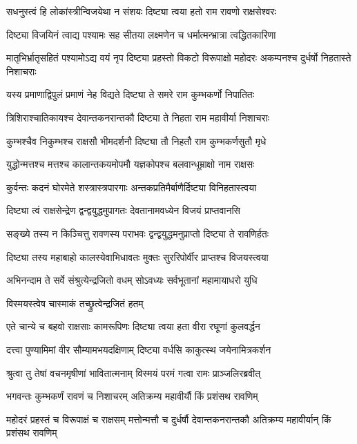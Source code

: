 \twolineshloka
{सधनुस्त्वं हि लोकांस्त्रीन्विजयेथा न संशयः}
{दिष्ट्या त्वया हतो राम रावणो राक्षसेश्वरः} %

\twolineshloka
{दिष्ट्या विजयिनं त्वाद्य पश्यामः सह सीतया}
{लक्ष्मणेन च धर्मात्मन्भ्रात्रा त्वद्धितकारिणा} %

\threelineshloka
{मातृभिर्भ्रातृसहितं पश्यामोऽद्य वयं नृप}
{दिष्ट्या प्रहस्तो विकटो विरूपाक्षो महोदरः}
{अकम्पनश्च दुर्धर्षो निहतास्ते निशाचराः} %

\twolineshloka
{यस्य प्रमाणाद्विपुलं प्रमाणं नेह विद्यते}
{दिष्ट्या ते समरे राम कुम्भकर्णो निपातितः} %

\twolineshloka
{त्रिशिराश्चातिकायश्च देवान्तकनरान्तकौ}
{दिष्ट्या ते निहता राम महावीर्या निशाचराः} %

\twolineshloka
{कुम्भश्चैव निकुम्भश्च राक्षसौ भीमदर्शनौ}
{दिष्ट्या तौ निहतौ राम कुम्भकर्णसुतौ मृधे} %

\twolineshloka
{युद्धोन्मत्तश्च मत्तश्च कालान्तकयमोपमौ}
{यज्ञकोपश्च बलवान्धूम्राक्षो नाम राक्षसः} %

\twolineshloka
{कुर्वन्तः कदनं घोरमेते शस्त्रास्त्रपारगाः}
{अन्तकप्रतिमैर्बाणैर्दिष्ट्या विनिहतास्त्वया} %

\twolineshloka
{दिष्ट्या त्वं राक्षसेन्द्रेण द्वन्द्वयुद्धमुपागतः}
{देवतानामवध्येन विजयं प्राप्तवानसि} %

\twolineshloka
{सङ्ख्ये तस्य न किञ्चित्तु रावणस्य पराभवः}
{द्वन्द्वयुद्धमनुप्राप्तो दिष्ट्या ते रावणिर्हतः} %

\twolineshloka
{दिष्ट्या तस्य महाबाहो कालस्येवाभिधावतः}
{मुक्तः सुररिपोर्वीर प्राप्तश्च विजयस्त्वया} %

\twolineshloka
{अभिनन्दाम ते सर्वे संश्रुत्येन्द्रजितो वधम्}
{सोऽवध्यः सर्वभूतानां महामायाधरो युधि} %

\onelineshloka
{विस्मयस्त्वेष चास्माकं तच्छ्रुत्वेन्द्रजितं हतम्} %

\twolineshloka
{एते चान्ये च बहवो राक्षसाः कामरूपिणः}
{दिष्ट्या त्वया हता वीरा रघूणां कुलवर्द्धन} %

\onelineshloka
{दत्त्वा पुण्यामिमां वीर सौम्यामभयदक्षिणाम् दिष्ट्या वर्धसि काकुत्स्थ जयेनामित्रकर्शन} %

\twolineshloka
{श्रुत्वा तु तेषां वचनमृषीणां भावितात्मनाम्}
{विस्मयं परमं गत्वा रामः प्राञ्जलिरब्रवीत्} %

\twolineshloka
{भगवन्तः कुम्भकर्णं रावणं च निशाचरम्}
{अतिक्रम्य महावीर्यौ किं प्रशंसथ रावणिम्} %

\twolineshloka
{महोदरं प्रहस्तं च विरूपाक्षं च राक्षसम्}
{मत्तोन्मत्तौ च दुर्धर्षौ देवान्तकनरान्तकौ अतिक्रम्य महावीर्यान् किं प्रशंसथ रावणिम्} %

